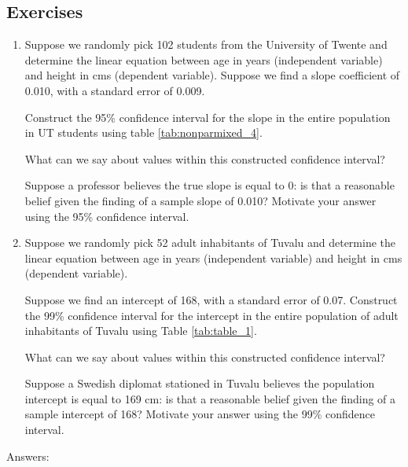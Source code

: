 \documentclass[]{report}\usepackage[]{graphicx}\usepackage[]{color}
\begin{document}
\subsection{Exercises}

\begin{enumerate}


\item Suppose we randomly pick 102 students from the University of Twente and determine the linear equation between age in years (independent variable) and height in cms (dependent variable). Suppose we find a slope coefficient of 0.010, with a standard error of 0.009. 

\subitem Construct the 95\% confidence interval for the slope in the entire population in UT students using table \ref{tab:nonparmixed_4}.

\subitem What can we say about values within this constructed confidence interval?

\subitem Suppose a professor believes the true slope is equal to 0: is that a reasonable belief given the finding of a sample slope of 0.010? Motivate your answer using the 95\% confidence interval.


\item Suppose we randomly pick 52 adult inhabitants of Tuvalu and determine the linear equation between age in years (independent variable) and height in cms (dependent variable). 

\subitem Suppose we find an intercept of 168, with a standard error of 0.07. Construct the 99\% confidence interval for the intercept in the entire population of adult inhabitants of Tuvalu using Table \ref{tab:table_1}.

\subitem What can we say about values within this constructed confidence interval?

\subitem Suppose a Swedish diplomat stationed in Tuvalu believes the population intercept is equal to 169 cm: is that a reasonable belief given the finding of a sample intercept of 168? Motivate your answer using the 99\% confidence interval.




\end{enumerate}


Answers:
\end{document}
